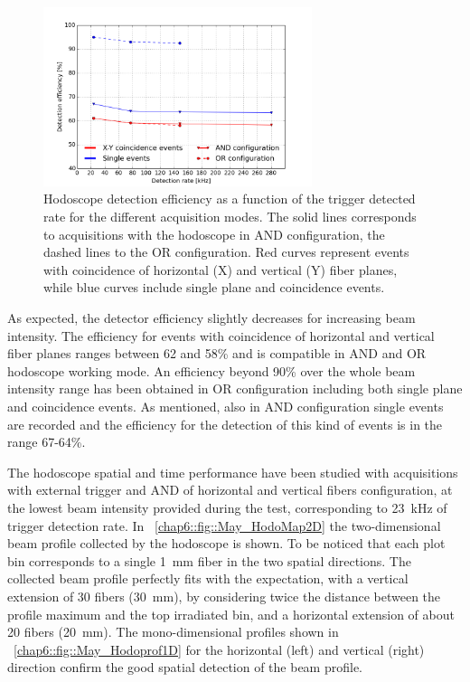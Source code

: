 \begin{figure}[!htbp]
\centering
\includegraphics[width=0.7\textwidth]{03_GraphicFiles/chapter6_BeamTests/Nice_May2018/MAY_Eff_intensity.png}
\caption{Hodoscope detection efficiency as a function of the trigger detected rate for the different acquisition modes. The solid lines corresponds to acquisitions with the hodoscope in AND configuration, the dashed lines to the OR configuration. Red curves represent events with coincidence of horizontal (X) and vertical (Y) fiber planes, while blue curves include single plane and coincidence events.}
\label{chap6::fig::May_HodoEffInt}
\end{figure}

As expected, the detector efficiency slightly decreases for increasing beam intensity. The efficiency for events with coincidence of horizontal and vertical fiber planes ranges between 62 and 58\% and is compatible in AND and OR hodoscope working mode. An efficiency beyond 90\% over the whole beam intensity range has been obtained in OR configuration including both single plane and coincidence events. As mentioned, also in AND configuration single events are recorded and the efficiency for the detection of this kind of events is in the range 67-64\%. 

The hodoscope spatial and time performance have been studied with acquisitions with external trigger and AND of horizontal and vertical fibers configuration, at the lowest beam intensity provided during the test, corresponding to 23~kHz of trigger detection rate. 
In \figurename~\ref{chap6::fig::May_HodoMap2D} the two-dimensional beam profile collected by the hodoscope is shown. To be noticed that each plot bin corresponds to a single 1~mm fiber in the two spatial directions. The collected beam profile perfectly fits with the expectation, with a vertical extension of 30 fibers (30~mm), by considering twice the distance between the profile maximum and the top irradiated bin, and a horizontal extension of about 20 fibers (20~mm). The mono-dimensional profiles shown in \figurename~\ref{chap6::fig::May_Hodoprof1D} for the horizontal (left) and vertical (right) direction confirm the good spatial detection of the beam profile.     


